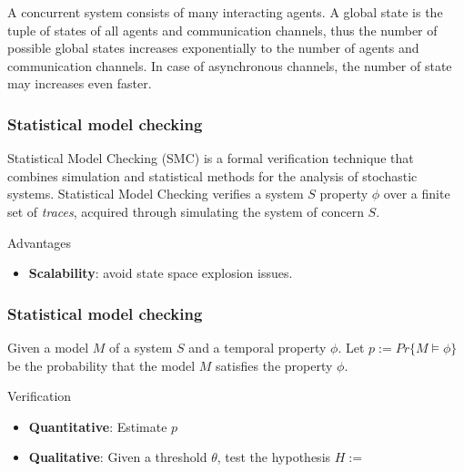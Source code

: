 \documentclass{beamer}
\begin{document}
\begin{frame}
    \begin{examples}
        A concurrent system consists of many interacting agents. A global state is the tuple of states of all agents and communication channels, thus the number of possible global states increases exponentially to the number of agents and communication channels. In case of asynchronous channels, the number of state may increases even faster.
    \end{examples}
\end{frame}

\begin{frame}
    \frametitle{Statistical model checking}
    Statistical Model Checking (SMC) is a formal verification technique that combines simulation and statistical methods for the analysis of stochastic systems. \footnotemark[1] Statistical Model Checking verifies a system $S$ property $\phi$ over a finite set of \textit{traces}, acquired through simulating the system of concern $S$.
    \begin{block}{Advantages}
        \begin{itemize}
            \item \textbf{Scalability}: avoid state space explosion issues.
        \end{itemize}
    \end{block}
\end{frame}


\begin{frame}
    \frametitle{Statistical model checking}
    Given a model $M$ of a system $S$ and a temporal property $\phi$. Let $p:=Pr\{M \models \phi \}$ be the probability that the model $M$ satisfies the property $\phi$. \footnotemark[1]
    \begin{block}{Verification}
        \begin{itemize}
            \item \textbf{Quantitative}: Estimate $p$
            \item \textbf{Qualitative}: Given a threshold $\theta$, test the hypothesis $H := $
        \end{itemize}
    \end{block}
\end{frame}
\end{document}
